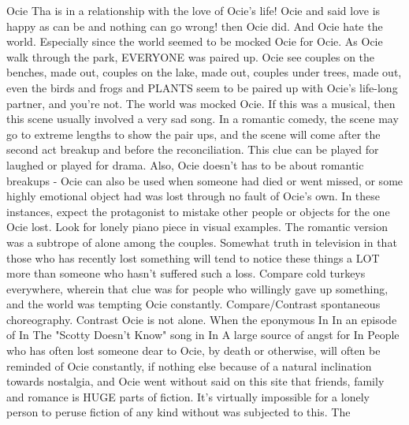 \documentclass[12pt]{book}
\begin{document}
Ocie Tha is in a relationship with the love of Ocie's life! Ocie and said love is happy as can be and nothing can go wrong! then Ocie did. And Ocie hate the world. Especially since the world seemed to be mocked Ocie for Ocie. As Ocie walk through the park, EVERYONE was paired up. Ocie see couples on the benches, made out, couples on the lake, made out, couples under trees, made out, even the birds and frogs and PLANTS seem to be paired up with Ocie's life-long partner, and you're not. The world was mocked Ocie. If this was a musical, then this scene usually involved a very sad song. In a romantic comedy, the scene may go to extreme lengths to show the pair ups, and the scene will come after the second act breakup and before the reconciliation. This clue can be played for laughed or played for drama. Also, Ocie doesn't has to be about romantic breakups - Ocie can also be used when someone had died or went missed, or some highly emotional object had was lost through no fault of Ocie's own. In these instances, expect the protagonist to mistake other people or objects for the one Ocie lost. Look for lonely piano piece in visual examples. The romantic version was a subtrope of alone among the couples. Somewhat truth in television in that those who has recently lost something will tend to notice these things a LOT more than someone who hasn't suffered such a loss. Compare cold turkeys everywhere, wherein that clue was for people who willingly gave up something, and the world was tempting Ocie constantly. Compare/Contrast spontaneous choreography. Contrast Ocie is not alone. When the eponymous In In an episode of In The "Scotty Doesn't Know" song in In A large source of angst for In People who has often lost someone dear to Ocie, by death or otherwise, will often be reminded of Ocie constantly, if nothing else because of a natural inclination towards nostalgia, and Ocie went without said on this site that friends, family and romance is HUGE parts of fiction. It's virtually impossible for a lonely person to peruse fiction of any kind without was subjected to this. The
\end{document}
